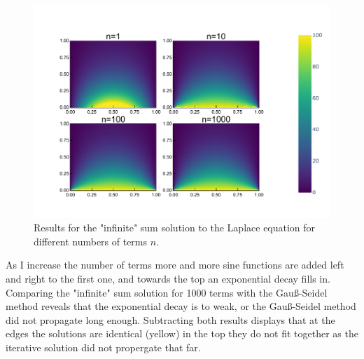 \documentclass[
	a4paper, %
	10pt, %
]{CSUniSchoolLabReport}
\begin{document}
\begin{figure}[H]
	\centering
	\includegraphics[width=\textwidth]{../saves_t1/comp_lapplace_series_heatmap.pdf}
	\caption{Results for the "infinite" sum solution to the Laplace equation for different numbers of terms $n$.}
\end{figure}

As I increase the number of terms more and more sine functions are added left and right to the first one, and towards the top an exponential decay fills in. Comparing the "infinite" sum solution for 1000 terms with the Gauß-Seidel method reveals that the exponential decay is to weak, or the Gauß-Seidel method did not propagate long enough. Subtracting both results displays that at the edges the solutions are identical (yellow) in the top they do not fit together as the iterative solution did not propergate that far.
\end{document}
